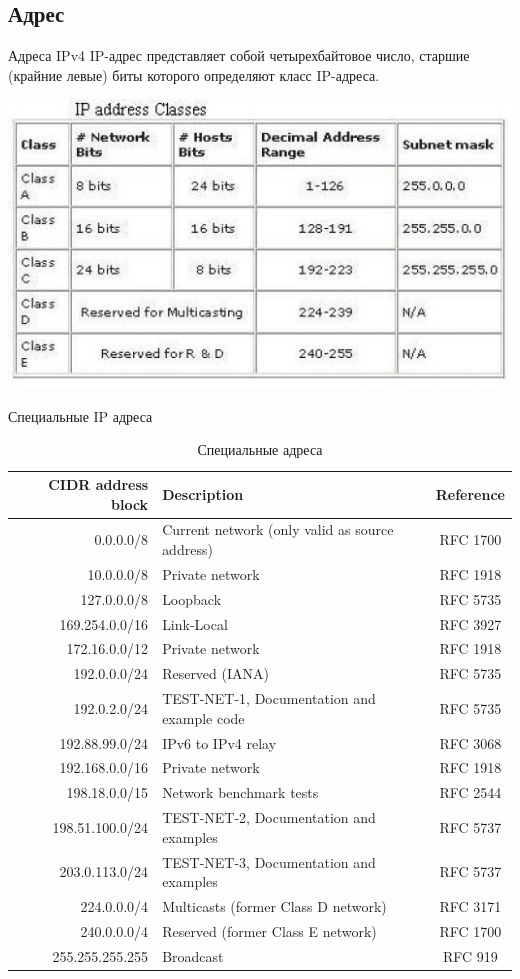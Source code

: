 \subsection{Адрес}
\begin{frame}{Адреса IPv4}
IP-адрес представляет собой четырехбайтовое число,  старшие (крайние левые) биты которого определяют класс IP-адреса.
	\begin{center}
		\includegraphics[height=0.6\textheight]{03-ip_class.png}
	\end{center}

\end{frame}

\begin{frame}{Специальные IP адреса}

	\scriptsize
	\begin{table}[ht]
	\centering
	\begin{tabular}[c]{r|l|c}
CIDR address block & Description & Reference \\
	\hline
0.0.0.0/8 &	Current network (only valid as source address)&	RFC 1700\\
10.0.0.0/8 &	Private network &		RFC 1918\\
127.0.0.0/8 &		Loopback &	RFC 5735\\
169.254.0.0/16 &	Link-Local &	RFC 3927\\
172.16.0.0/12 &	Private network &		RFC 1918\\
192.0.0.0/24 &	Reserved (IANA) &		RFC 5735\\
192.0.2.0/24 &	TEST-NET-1,  Documentation and example code &		RFC 5735\\
192.88.99.0/24 &	IPv6 to IPv4 relay &	RFC 3068\\
192.168.0.0/16 &	Private network &		RFC 1918\\
198.18.0.0/15 &	Network benchmark tests &		RFC 2544\\
198.51.100.0/24 &		TEST-NET-2,  Documentation and examples &		RFC 5737\\
203.0.113.0/24 &	TEST-NET-3,  Documentation and examples &		RFC 5737\\
224.0.0.0/4 &		Multicasts (former Class D network) &		RFC 3171\\
240.0.0.0/4 &		Reserved (former Class E network) &	RFC 1700\\
255.255.255.255 &		Broadcast &	RFC 919
	\end{tabular}
	\caption{Специальные адреса}
	\end{table}
	\normalsize
\end{frame}

